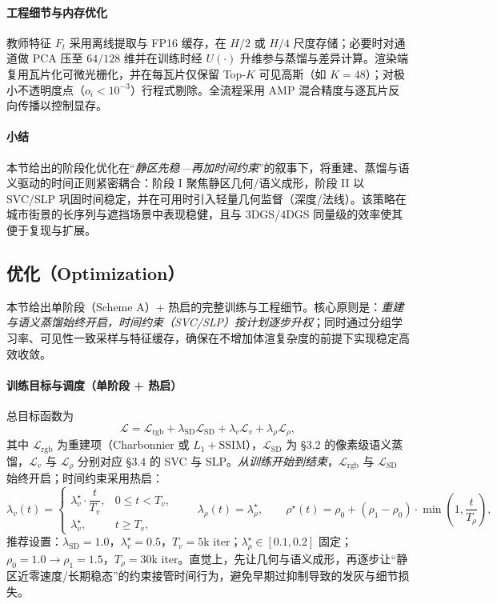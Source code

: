\documentclass[10pt,conference]{IEEEtran} %
\begin{document}
\paragraph{工程细节与内存优化}
教师特征 $F_t$ 采用离线提取与 FP16 缓存，在 $H/2$ 或 $H/4$ 尺度存储；必要时对通道做 PCA 压至 $64/128$ 维并在训练时经 $U(\cdot)$ 升维参与蒸馏与差异计算。渲染端复用瓦片化可微光栅化，并在每瓦片仅保留 Top-$K$ 可见高斯（如 $K{=}48$）；对极小不透明度点（$o_i{<}10^{-3}$）行程式剔除。全流程采用 AMP 混合精度与逐瓦片反向传播以控制显存。

\paragraph{小结}
本节给出的阶段化优化在“\emph{静区先稳—再加时间约束}”的叙事下，将重建、蒸馏与语义驱动的时间正则紧密耦合：阶段 I 聚焦静区几何/语义成形，阶段 II 以 SVC/SLP 巩固时间稳定，并在可用时引入轻量几何监督（深度/法线）。该策略在城市街景的长序列与遮挡场景中表现稳健，且与 3DGS/4DGS 同量级的效率使其便于复现与扩展。


\subsection{优化（Optimization）}
本节给出单阶段（Scheme A）+ 热启的完整训练与工程细节。核心原则是：\emph{重建与语义蒸馏始终开启，时间约束（SVC/SLP）按计划逐步升权}；同时通过分组学习率、可见性一致采样与特征缓存，确保在不增加体渲复杂度的前提下实现稳定高效收敛。

\paragraph{训练目标与调度（单阶段 + 热启）}
总目标函数为
\begin{equation}
\mathcal L
=\mathcal L_{\mathrm{rgb}}
+\lambda_{\mathrm{SD}}\mathcal L_{\mathrm{SD}}
+\lambda_v \mathcal L_v
+\lambda_\rho \mathcal L_\rho,
\label{eq:opt_total_loss}
\end{equation}
其中 $\mathcal L_{\mathrm{rgb}}$ 为重建项（Charbonnier 或 $L_1{+}\mathrm{SSIM}$），$\mathcal L_{\mathrm{SD}}$ 为 §3.2 的像素级语义蒸馏，$\mathcal L_v$ 与 $\mathcal L_\rho$ 分别对应 §3.4 的 SVC 与 SLP。\emph{从训练开始到结束}，$\mathcal L_{\mathrm{rgb}}$ 与 $\mathcal L_{\mathrm{SD}}$ 始终开启；时间约束采用热启：
\begin{equation}
\lambda_v(t)=
\begin{cases}
\lambda_v^\star \cdot \dfrac{t}{T_v}, & 0\le t<T_v,\\[4pt]
\lambda_v^\star, & t\ge T_v,
\end{cases}
\qquad
\lambda_\rho(t)=\lambda_\rho^\star,
\qquad
\rho^\star(t)=\rho_0+(\rho_1-\rho_0)\cdot \min\!\left(1,\dfrac{t}{T_\rho}\right),
\label{eq:warmup_schedule}
\end{equation}
推荐设置：$\lambda_{\mathrm{SD}}{=}1.0$，$\lambda_v^\star{=}0.5$，$T_v{=}5$k iter；$\lambda_\rho^\star\!\in[0.1,0.2]$ 固定；$\rho_0{=}1.0\rightarrow\rho_1{=}1.5$，$T_\rho{=}30$k iter。直觉上，先让几何与语义成形，再逐步让“静区近零速度/长期稳态”的约束接管时间行为，避免早期过抑制导致的发灰与细节损失。
\end{document}

